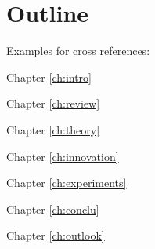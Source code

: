    \section{Outline}
        Examples for cross references: 

        Chapter \ref{ch:intro} \lipsum[1]

        Chapter \ref{ch:review} \lipsum[1]
        
        Chapter \ref{ch:theory} \lipsum[1]
        
        Chapter \ref{ch:innovation} \lipsum[1]
        
        Chapter \ref{ch:experiments} \lipsum[1]
        
        Chapter \ref{ch:conclu} \lipsum[1]
        
        Chapter \ref{ch:outlook} \lipsum[1]


